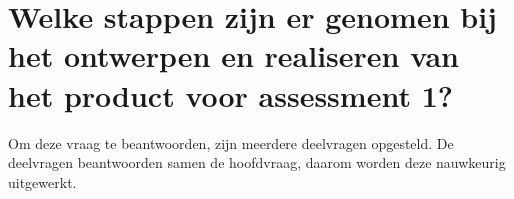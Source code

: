 \section{Welke stappen zijn er genomen bij het ontwerpen en realiseren van het product voor assessment 1?}
Om deze vraag te beantwoorden, zijn meerdere deelvragen opgesteld. De deelvragen beantwoorden samen de hoofdvraag, daarom worden deze nauwkeurig uitgewerkt. 